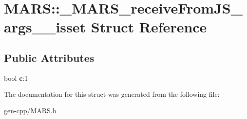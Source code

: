 \hypertarget{structMARS_1_1__MARS__receiveFromJS__args____isset}{}\section{M\+A\+RS\+:\+:\+\_\+\+M\+A\+R\+S\+\_\+receive\+From\+J\+S\+\_\+args\+\_\+\+\_\+isset Struct Reference}
\label{structMARS_1_1__MARS__receiveFromJS__args____isset}
\subsection*{Public Attributes}
\begin{DoxyCompactItemize}
\item 
\mbox{\label{structMARS_1_1__MARS__receiveFromJS__args____isset_a20094ce27d2eaecd655ba5e0124328ff}} 
bool {\bfseries c}\+:1
\end{DoxyCompactItemize}


The documentation for this struct was generated from the following file\+:\begin{DoxyCompactItemize}
\item 
gen-\/cpp/M\+A\+R\+S.\+h\end{DoxyCompactItemize}
